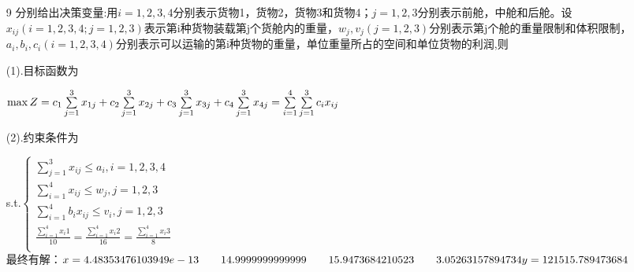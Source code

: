 \documentclass[a4paper,20pt]{article}
\begin{document}
\begin{itemize}
\item[9]分别给出决策变量:用$i=1,2,3,4$分别表示货物1，货物2，货物3和货物4；$j=1,2,3$分别表示前舱，中舱和后舱。设$x_{ij}(i=1,2,3,4;j=1,2,3)$表示第i种货物装载第j个货舱内的重量，$w_j,v_j(j=1,2,3)$分别表示第j个舱的重量限制和体积限制，$a_i,b_i,c_i(i=1,2,3,4)$分别表示可以运输的第i种货物的重量，单位重量所占的空间和单位货物的利润,则
\par (1).目标函数为\par $\max Z=c_1\sum\limits_{j=1}^3x_{1j}+c_2\sum\limits_{j=1}^3x_{2j}+c_3\sum\limits_{j=1}^3x_{3j}+c_4\sum\limits_{j=1}^3x_{4j}\\=\sum\limits_{i=1}^4\sum\limits_{j=1}^3c_ix_{ij}$
\par (2).约束条件为\par s.t.$\left\{\begin{matrix}
    \sum\limits_{j=1}^3x_{ij}\leq a_i,i=1,2,3,4\\
    \sum\limits_{i=1}^4x_{ij}\leq w_j,j=1,2,3\\
    \sum\limits_{i=1}^4b_ix_{ij}\leq v_i,j=1,2,3\\
    \frac{\sum\limits_{i=1}^4x_i1}{10}=\frac{\sum\limits_{i=1}^4x_i2}{16}=\frac{\sum\limits_{i=1}^4x_i3}{8}\\
\end{matrix}\right.$
\\最终有解：$x =
4.48353476103949e-13      \qquad    14.9999999999999      \qquad    15.9473684210523      \\ \qquad   3.05263157894734
\\y =121515.789473684$

\end{itemize}
\end{document}
